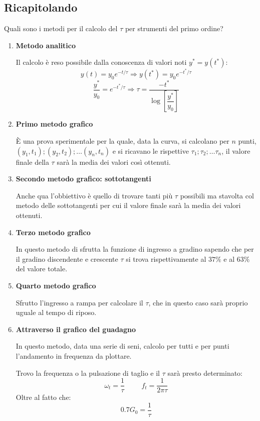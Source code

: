 \documentclass[a4paper, 15pt]{article}
\begin{document}
\subsection{Ricapitolando} 	
\begin{adjustwidth}{2in}{}	
	Quali sono i metodi per il calcolo del $\tau$ per strumenti del primo ordine? 
	\begin{enumerate}
		\item \textbf{Metodo analitico}  
		
		Il calcolo è reso possibile dalla conoscenza di valori noti $y^* = y(t^*)$: 
		\[ y(t) = y_0e^{-t/\tau} \Rightarrow y(t^*) = y_0e^{-t^*/\tau} \]
		\[  \dfrac{y^*}{y_0} = e^{-t^*/\tau} \Rightarrow \tau = \dfrac{-t^*}{\log \left[\dfrac{y^*}{y_0}\right]}\]
		
		\item \textbf{Primo metodo grafico} 
		
		È una prova sperimentale per la quale, data la curva, si calcolano per $n$ punti, $(y_1, t_1); (y_2, t_2); \dots (y_n, t_n)$ e si ricavano le rispettive $\tau_1; \tau_2; \dots \tau_n$, il valore finale della $\tau$ sarà la media dei valori così ottenuti.
		
		\item \textbf{Secondo metodo grafico: sottotangenti} 
		 
		Anche qua l'obbiettivo è quello di trovare tanti più $\tau$ possibili ma stavolta col metodo delle sottotangenti per cui il valore finale sarà la media dei valori ottenuti.

		\item \textbf{Terzo metodo grafico}
		
		In questo metodo di sfrutta la funzione di ingresso a gradino sapendo che per il gradino discendente e crescente $\tau$ si trova rispettivamente al $37\%$ e al $63\%$ del valore totale.
		
		\item \textbf{Quarto metodo grafico} 
		
		Sfrutto l'ingresso a rampa per calcolare il $\tau$, che in questo caso sarà proprio uguale al tempo di riposo. 
		
		\item \textbf{Attraverso il grafico del guadagno} 
		
		In questo metodo, data una serie di seni, calcolo per tutti e per punti l'andamento in frequenza da plottare. 
		
		Trovo la frequenza o la pulsazione di taglio e il $\tau$ sarà presto determinato: 
		\[\omega_t = \dfrac{1}{\tau} \hspace{1cm}  f_t = \dfrac{1}{2\pi\tau} \]	
		Oltre al fatto che:
		\[0.7G_0 = \dfrac{1}{\tau}\]	
	\end{enumerate}
\end{adjustwidth}
\newpage
\end{document}
